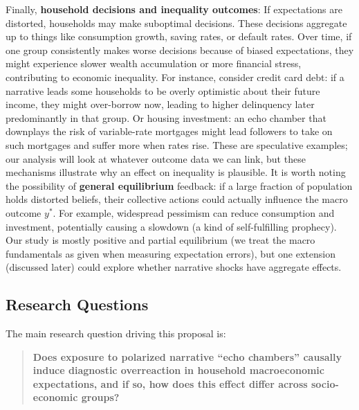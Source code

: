 \documentclass[12pt]{article}
\begin{document}
Finally, \textbf{household decisions and inequality outcomes}: If expectations are distorted, households may make suboptimal decisions. These decisions aggregate up to things like consumption growth, saving rates, or default rates. Over time, if one group consistently makes worse decisions because of biased expectations, they might experience slower wealth accumulation or more financial stress, contributing to economic inequality. For instance, consider credit card debt: if a narrative leads some households to be overly optimistic about their future income, they might over-borrow now, leading to higher delinquency later predominantly in that group. Or housing investment: an echo chamber that downplays the risk of variable-rate mortgages might lead followers to take on such mortgages and suffer more when rates rise. These are speculative examples; our analysis will look at whatever outcome data we can link, but these mechanisms illustrate why an effect on inequality is plausible.
It is worth noting the possibility of \textbf{general equilibrium} feedback: if a large fraction of population holds distorted beliefs, their collective actions could actually influence the macro outcome $y^*$. For example, widespread pessimism can reduce consumption and investment, potentially causing a slowdown (a kind of self-fulfilling prophecy). Our study is mostly positive and partial equilibrium (we treat the macro fundamentals as given when measuring expectation errors), but one extension (discussed later) could explore whether narrative shocks have aggregate effects.

\subsection{Research Questions}
The main research question driving this proposal is:
\begin{quote}
    \textbf{Does exposure to polarized narrative “echo chambers” causally induce diagnostic overreaction in household macroeconomic expectations, and if so, how does this effect differ across socio-economic groups?}
\end{quote}
\end{document}
